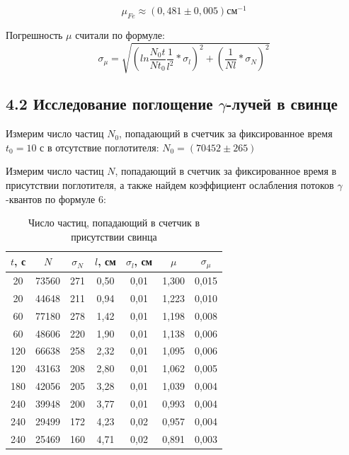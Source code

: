 \documentclass[a4paper,12pt]{report}
\begin{document}
\begin{equation*}
    \mu_{Fe} \approx (0,481\pm0,005)\text{см}^{-1}
\end{equation*}

Погрешность $\mu$ считали по формуле:
\begin{equation*}
    \sigma_{\mu} = \sqrt{(ln\frac{N_{0}t}{Nt_{0}}\frac{1}{l^{2}}*\sigma_{l})^{2} + (\frac{1}{Nl}*\sigma_{N})^2}
\end{equation*}

\subsection*{4.2 Исследование поглощение $\gamma$-лучей в свинце}

Измерим число частиц $N_{0}$, попадающий в счетчик за фиксированное время $t_{0} = 10$ с в отсутствие поглотителя: $N_{0} = (70452\pm265)$

Измерим число частиц $N$, попадающий в счетчик за фиксированное время в присутствии поглотителя, а также найдем коэффициент ослабления потоков $\gamma$-квантов по формуле 6:

\begin{table}[H]
\begin{tabular}{|c|c|c|c|c|c|c|}
\hline
$t$, с & $N$     & $\sigma_{N}$ & $l$, см & $\sigma_{l}$, см & $\mu$    & $\sigma_{\mu}$ \\ \hline
20   & 73560 & 271          & 0,50  & 0,01             & 1,300 & 0,015    \\ \hline
20   & 44648 & 211          & 0,94  & 0,01             & 1,223 & 0,010    \\ \hline
60   & 77180 & 278          & 1,42  & 0,01             & 1,198 & 0,008    \\ \hline
60   & 48606 & 220          & 1,90  & 0,01             & 1,138 & 0,006    \\ \hline
120  & 66638 & 258          & 2,32  & 0,01             & 1,095 & 0,006    \\ \hline
120  & 43163 & 208          & 2,80  & 0,01             & 1,062 & 0,005    \\ \hline
180  & 42056 & 205          & 3,28  & 0,01             & 1,039 & 0,004    \\ \hline
240  & 39948 & 200          & 3,77  & 0,01             & 0,993 & 0,004    \\ \hline
240  & 29499 & 172          & 4,23  & 0,02             & 0,957 & 0,004    \\ \hline
240  & 25469 & 160          & 4,71  & 0,02             & 0,891 & 0,003    \\ \hline
\end{tabular}
\caption{Число частиц, попадающий в счетчик в присутствии свинца}
\end{table}
\end{document}
